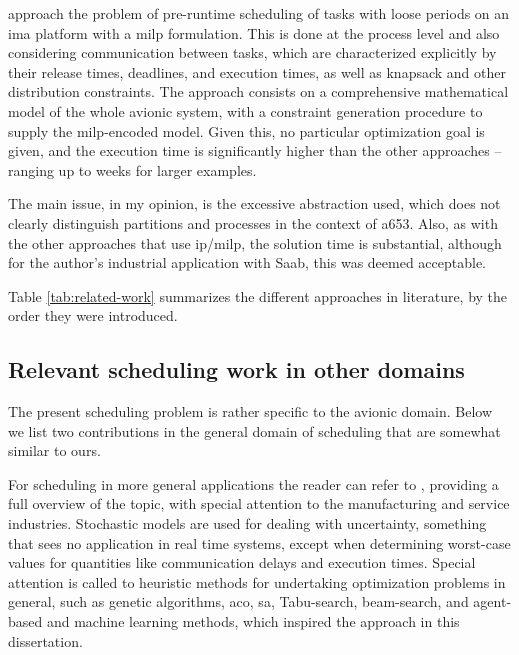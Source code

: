 \documentclass[main.tex]{subfiles}
\begin{document}
\Textcite{blikstad2018optimisation} approach the problem of pre-runtime scheduling of tasks with loose periods on an \gls{ima} platform with a \gls{milp} formulation.
This is done at the process level and also considering communication between tasks, which are characterized explicitly by their release times, deadlines, and execution times, as well as knapsack and other distribution constraints. 
The approach consists on a comprehensive mathematical model of the whole avionic system, with a constraint generation procedure to supply the \gls{milp}-encoded model.
Given this, no particular optimization goal is given, and the execution time is significantly higher than the other approaches -- ranging up to weeks for larger examples.

The main issue, in my opinion, is the excessive abstraction used, which does not clearly distinguish partitions and processes in the context of \gls{a653}.
Also, as with the other approaches that use \gls{ip}/\gls{milp}, the solution time is substantial, although for the author's industrial application with Saab, this was deemed acceptable.

Table \ref{tab:related-work} summarizes the different approaches in literature, by the order they were introduced.


\subsection{Relevant scheduling work in other domains}

The present scheduling problem is rather specific to the avionic domain.
Below we list two contributions in the general domain of scheduling that are somewhat similar to ours.

For scheduling in more general applications the reader can refer to \textcite{pinedo2008scheduling}, providing a full overview of the topic, with special attention to the manufacturing and service industries.
Stochastic models are used for dealing with uncertainty, something that sees no application in real time systems, except when determining worst-case values for quantities like communication delays and execution times.
Special attention is called to heuristic methods for undertaking optimization problems in general, such as genetic algorithms, \gls{aco}, \gls{sa}, Tabu-search, beam-search, and agent-based and machine learning methods, which inspired the approach in this dissertation.
\end{document}
